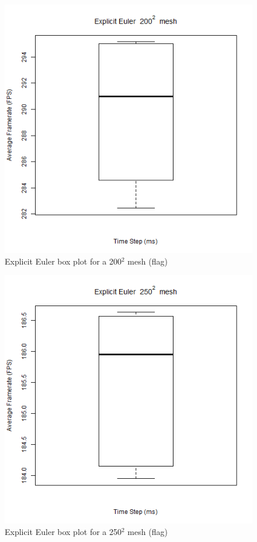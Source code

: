       \begin{figure}
    \begin{center}
      \includegraphics[scale=.9]{Figures/flag_ee_200_box}
    \end{center}
    \caption{Explicit Euler box plot for a 200$^{2}$ mesh (flag)}
    \label{fig:ee box 200 flag}
  \end{figure}
  
      \begin{figure}
    \begin{center}
      \includegraphics[scale=.9]{Figures/flag_ee_250_box}
    \end{center}
    \caption{Explicit Euler box plot for a 250$^{2}$ mesh (flag)}
    \label{fig:ee box 250 flag}
  \end{figure}
  
